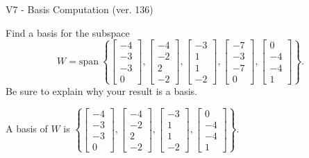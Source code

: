 \begin{exercise}
  \begin{exerciseTitle}V7 - Basis Computation (ver. 136)\end{exerciseTitle}
  \begin{exerciseStatement}
    Find a basis for the subspace 
\[W=\mathrm{span}\ \left\{\left[\begin{array}{r}
-4 \\
-3 \\
-3 \\
0
\end{array}\right] , \left[\begin{array}{r}
-4 \\
-2 \\
2 \\
-2
\end{array}\right] , \left[\begin{array}{r}
-3 \\
1 \\
1 \\
-2
\end{array}\right] , \left[\begin{array}{r}
-7 \\
-3 \\
-7 \\
0
\end{array}\right] , \left[\begin{array}{r}
0 \\
-4 \\
-4 \\
1
\end{array}\right]\right\}.\]
 Be sure to explain why your result is a basis.


  \end{exerciseStatement}
  \begin{exerciseAnswer}
   A basis of \(W\) is  \(\left\{\left[\begin{array}{r}
-4 \\
-3 \\
-3 \\
0
\end{array}\right] , \left[\begin{array}{r}
-4 \\
-2 \\
2 \\
-2
\end{array}\right] , \left[\begin{array}{r}
-3 \\
1 \\
1 \\
-2
\end{array}\right] , \left[\begin{array}{r}
0 \\
-4 \\
-4 \\
1
\end{array}\right]\right\}\).
  


  \end{exerciseAnswer}
\end{exercise}
